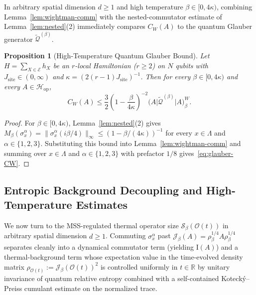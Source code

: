 \documentclass[11pt,a4paper]{article}
\numberwithin{equation}{section}
\theoremstyle{plain}
\newtheorem{proposition}[theorem]{Proposition}
\theoremstyle{definition}
\newcommand{\Hop}{\mathcal{H}_{\mathrm{op}}}
\begin{document}
In arbitrary spatial dimension $d\ge 1$ and high temperature $\beta\in[0,4\kappa)$, combining Lemma~\ref{lem:wightman-comm} with the nested-commutator estimate of Lemma~\ref{lem:nested}(2) immediately compares $C_W(A)$ to the quantum Glauber generator $\widetilde{\mathcal{Q}}^{(\beta)}$.

\begin{proposition}[High-Temperature Quantum Glauber Bound]\label{prop:glauber}
Let $H = \sum_{X\in\mathcal{E}} h_X$ be an $r$-local Hamiltonian ($r\ge 2$) on $N$ qubits with $J_{\mathrm{site}} \in (0,\infty)$ and $\kappa = (2(r-1)J_{\mathrm{site}})^{-1}$. Then for every $\beta\in[0,4\kappa)$ and every $A\in\Hop$,
\begin{equation}\label{eq:glauber-CW}
  C_W(A) \le \frac{3}{2}\left(1 - \frac{\beta}{4\kappa}\right)^{-2}\bigl(A\big|\widetilde{\mathcal{Q}}^{(\beta)}\big|A\bigr)_\beta^W.
\end{equation}
\end{proposition}

\begin{proof}
For $\beta\in[0,4\kappa)$, Lemma~\ref{lem:nested}(2) gives $M_\beta(\sigma_x^\alpha) = \|\sigma_x^\alpha(i\beta/4)\|_\infty \le (1-\beta/(4\kappa))^{-1}$ for every $x\in\Lambda$ and $\alpha\in\{1,2,3\}$. Substituting this bound into Lemma~\ref{lem:wightman-comm} and summing over $x\in\Lambda$ and $\alpha\in\{1,2,3\}$ with prefactor $1/8$ gives~\eqref{eq:glauber-CW}.
\end{proof}

\subsection{Entropic Background Decoupling and High-Temperature Estimates}\label{subsec:entropic}

We now turn to the MSS-regulated thermal operator size $\mathcal{S}_\beta(\mathcal{O}(t))$ in arbitrary spatial dimension $d\ge 1$. Commuting $\sigma_x^\alpha$ past $\mathcal{J}_\beta(A) = \rho_\beta^{1/4}A\rho_\beta^{1/4}$ separates cleanly into a dynamical commutator term (yielding $\mathrm{I}(A)$) and a thermal-background term whose expectation value in the time-evolved density matrix $\rho_{\mathcal{O}(t)} := \mathcal{J}_\beta(\mathcal{O}(t))^2$ is controlled uniformly in $t\in\mathbb{R}$ by unitary invariance of quantum relative entropy combined with a self-contained Koteck\'y--Preiss cumulant estimate on the normalized trace.
\end{document}
